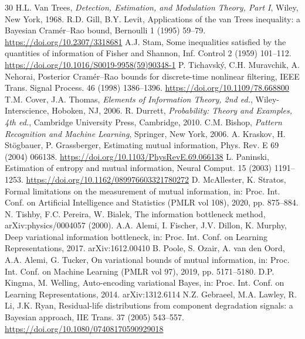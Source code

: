 \begin{thebibliography}{30}
 H.L. Van Trees, {\it Detection, Estimation, and Modulation Theory, Part I}, Wiley, New York, 1968.
 R.D. Gill, B.Y. Levit, Applications of the van Trees inequality: a Bayesian Cram\'er--Rao bound, Bernoulli 1 (1995) 59--79. \url{https://doi.org/10.2307/3318681}
 A.J. Stam, Some inequalities satisfied by the quantities of information of Fisher and Shannon, Inf. Control 2 (1959) 101--112. \url{https://doi.org/10.1016/S0019-9958(59)90348-1}
 P. Tichavsk\'y, C.H. Muravchik, A. Nehorai, Posterior Cram\'er--Rao bounds for discrete-time nonlinear filtering, IEEE Trans. Signal Process. 46 (1998) 1386--1396. \url{https://doi.org/10.1109/78.668800}
 T.M. Cover, J.A. Thomas, {\it Elements of Information Theory, 2nd ed.}, Wiley-Interscience, Hoboken, NJ, 2006.
 R. Durrett, {\it Probability: Theory and Examples, 4th ed.}, Cambridge University Press, Cambridge, 2010.
 C.M. Bishop, {\it Pattern Recognition and Machine Learning}, Springer, New York, 2006.
 A. Kraskov, H. St\"ogbauer, P. Grassberger, Estimating mutual information, Phys. Rev. E 69 (2004) 066138. \url{https://doi.org/10.1103/PhysRevE.69.066138}
 L. Paninski, Estimation of entropy and mutual information, Neural Comput. 15 (2003) 1191--1253. \url{https://doi.org/10.1162/089976603321780272}
 D. McAllester, K. Stratos, Formal limitations on the measurement of mutual information, in: Proc. Int. Conf. on Artificial Intelligence and Statistics (PMLR vol 108), 2020, pp. 875--884.
 N. Tishby, F.C. Pereira, W. Bialek, The information bottleneck method, arXiv:physics/0004057 (2000).
 A.A. Alemi, I. Fischer, J.V. Dillon, K. Murphy, Deep variational information bottleneck, in: Proc. Int. Conf. on Learning Representations, 2017. arXiv:1612.00410
 B. Poole, S. Ozair, A. van den Oord, A.A. Alemi, G. Tucker, On variational bounds of mutual information, in: Proc. Int. Conf. on Machine Learning (PMLR vol 97), 2019, pp. 5171--5180.
 D.P. Kingma, M. Welling, Auto-encoding variational Bayes, in: Proc. Int. Conf. on Learning Representations, 2014. arXiv:1312.6114
 N.Z. Gebraeel, M.A. Lawley, R. Li, J.K. Ryan, Residual-life distributions from component degradation signals: a Bayesian approach, IIE Trans. 37 (2005) 543--557. \url{https://doi.org/10.1080/07408170590929018}

\end{thebibliography}
